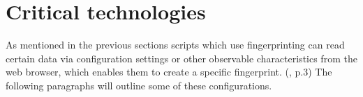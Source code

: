 \section{Critical technologies}

As mentioned in the previous sections scripts which use fingerprinting can read certain data via configuration settings or other observable characteristics from the web browser, which enables them to create a specific fingerprint. (\textcite{doty18}, p.3) The following paragraphs will outline some of these configurations. 

